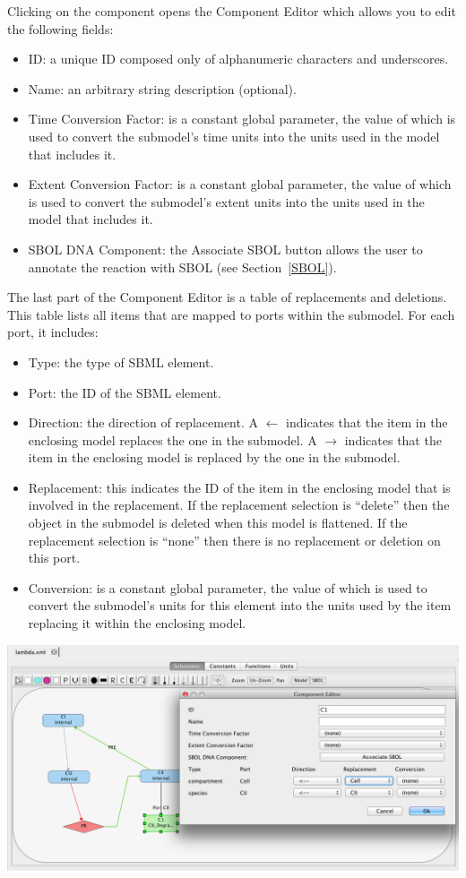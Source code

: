 \documentclass[titlepage,11pt]{article}
\begin{document}
Clicking on the component opens the Component Editor which allows you to edit the following fields:
\begin{itemize}
\item ID: a unique ID composed only of alphanumeric characters and underscores.
\item Name: an arbitrary string description (optional).
\item Time Conversion Factor: is a constant global parameter, the value of which is used to convert the submodel's time units into the units used in the model that includes it.
\item Extent Conversion Factor: is a constant global parameter, the value of which is used to convert the submodel's extent units into the units used in the model that includes it.
\item SBOL DNA Component: the Associate SBOL button allows the user to annotate the reaction with SBOL (see Section~\ref{SBOL}).
\end{itemize}
The last part of the Component Editor is a table of replacements and deletions.  This table lists all items that are mapped to ports within the submodel.  For each port, it includes:
\begin{itemize}
\item Type: the type of SBML element.
\item Port: the ID of the SBML element.
\item Direction: the direction of replacement.  A $\leftarrow$ indicates that the item in the enclosing model replaces the one in the submodel.  A $\rightarrow$ indicates that the item in the enclosing model is replaced by the one in the submodel.
\item Replacement: this indicates the ID of the item in the enclosing model that is involved in the replacement.  If the replacement selection is ``delete'' then the object in the submodel is deleted when this model is flattened.  If the replacement selection is ``none'' then there is no replacement or deletion on this port.
\item Conversion: is a constant global parameter, the value of which is used to convert the submodel's units for this element into the units used by the item replacing it within the enclosing model.
\end{itemize}

\begin{center}
\includegraphics[width=160mm]{screenshots/editComp}
\end{center}
\end{document}
